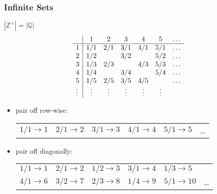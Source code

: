 \documentclass[dvipsnames]{beamer}
\begin{document}
\begin{frame}
  \frametitle{Infinite Sets}

  \begin{footnotesize}
  \begin{block}{$|\mathbb{Z}^+| = |\mathbb{Q}|$}
    \[
    \begin{array}{l|ccccccc|}
             &  $1$   &  $2$   &  $3$   &  $4$   &  $5$   & \ldots\\\hline
      $1$    & $1/1$  & $2/1$  & $3/1$  & $4/1$  & $5/1$  & \ldots\\
      $2$    & $1/2$  &        & $3/2$  &        & $5/2$  & \ldots\\
      $3$    & $1/3$  & $2/3$  &        & $4/3$  & $5/3$  & \ldots\\
      $4$    & $1/4$  &        & $3/4$  &        & $5/4$  & \ldots\\
      $5$    & $1/5$  & $2/5$  & $3/5$  & $4/5$  &        & \ldots\\
      \vdots & \vdots & \vdots & \vdots & \vdots & \vdots &
    \end{array}
    \]

    \begin{itemize}
      \item pair off row-wise:\\
      \begin{tabular}{llllll}
        $1/1 \rightarrow 1$ & $2/1 \rightarrow 2$ & $3/1 \rightarrow 3$
                            & $4/1 \rightarrow 4$ & $5/1 \rightarrow 5$ & \ldots\\
      \end{tabular}

      \pause
      \item pair off diagonally:\\
      \begin{tabular}{llllll}
        $1/1 \rightarrow 1$ & $2/1 \rightarrow 2$ & $1/2 \rightarrow 3$
                            & $3/1 \rightarrow 4$ & $1/3 \rightarrow 5$ & \\
        $4/1 \rightarrow 6$ & $3/2 \rightarrow 7$ & $2/3 \rightarrow 8$
                            & $1/4 \rightarrow 9$ & $5/1 \rightarrow 10$ & \ldots
      \end{tabular}
    \end{itemize}
  \end{block}
  \end{footnotesize}
\end{frame}
\end{document}
